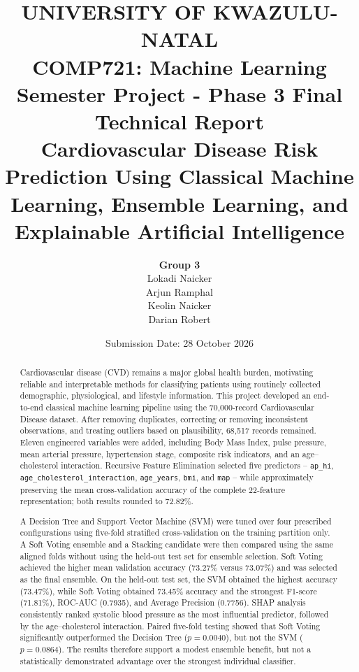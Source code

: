 \documentclass[11pt,a4paper]{article}
\title{
    \vspace{1.0cm}
    \normalsize UNIVERSITY OF KWAZULU-NATAL \\
    COMP721: Machine Learning \\
    \large \textbf{Semester Project - Phase 3 Final Technical Report} \\
    \normalsize Cardiovascular Disease Risk Prediction Using Classical Machine Learning,
    Ensemble Learning, and Explainable Artificial Intelligence
}
\author{
    \small
    \textbf{Group 3} \\
    Lokadi Naicker \\
    Arjun Ramphal \\
    Keolin Naicker \\
    Darian Robert
}
\date{\small Submission Date: 28 October 2026}
\newcommand{\code}[1]{\texttt{#1}}
\begin{document}
\begin{titlepage}
\maketitle
\thispagestyle{empty}
\begin{abstract}
Cardiovascular disease (CVD) remains a major global health burden, motivating reliable and interpretable methods for classifying patients using routinely collected demographic, physiological, and lifestyle information. This project developed an end-to-end classical machine learning pipeline using the 70,000-record Cardiovascular Disease dataset. After removing duplicates, correcting or removing inconsistent observations, and treating outliers based on plausibility, 68,517 records remained. Eleven engineered variables were added, including Body Mass Index, pulse pressure, mean arterial pressure, hypertension stage, composite risk indicators, and an age--cholesterol interaction. Recursive Feature Elimination selected five predictors -- \code{ap\_hi}, \code{age\_cholesterol\_interaction}, \code{age\_years}, \code{bmi}, and \code{map} -- while approximately preserving the mean cross-validation accuracy of the complete 22-feature representation; both results rounded to 72.82\%.

A Decision Tree and Support Vector Machine (SVM) were tuned over four prescribed configurations using five-fold stratified cross-validation on the training partition only. A Soft Voting ensemble and a Stacking candidate were then compared using the same aligned folds without using the held-out test set for ensemble selection. Soft Voting achieved the higher mean validation accuracy (73.27\% versus 73.07\%) and was selected as the final ensemble. On the held-out test set, the SVM obtained the highest accuracy (73.47\%), while Soft Voting obtained 73.45\% accuracy and the strongest F1-score (71.81\%), ROC-AUC (0.7935), and Average Precision (0.7756). SHAP analysis consistently ranked systolic blood pressure as the most influential predictor, followed by the age--cholesterol interaction. Paired five-fold testing showed that Soft Voting significantly outperformed the Decision Tree ($p=0.0040$), but not the SVM ($p=0.0864$). The results therefore support a modest ensemble benefit, but not a statistically demonstrated advantage over the strongest individual classifier.
\end{abstract}

\end{titlepage}
\clearpage
\end{document}
